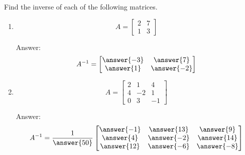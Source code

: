 \documentclass{ximera}
\begin{document}
\begin{problem}

  Find the inverse of each of the following matrices.
  \begin{enumerate}
   \item $$A=\begin{bmatrix}2&7\\1&3\end{bmatrix}$$

    Answer:
    $$A^{-1}=\begin{bmatrix}\answer{-3}&\answer{7}\\\answer{1}&\answer{-2}\end{bmatrix}$$
    
     
    \item $$A=\begin{bmatrix}2&1&4\\4&-2&1\\0&3&-1\end{bmatrix}$$

    Answer:
    $$A^{-1}=\frac{1}{\answer{50}}\begin{bmatrix}\answer{-1}&\answer{13}&\answer{9}\\\answer{4}&\answer{-2}&\answer{14}\\\answer{12}&\answer{-6}&\answer{-8}\end{bmatrix}$$

    \end{enumerate}
\end{problem}
\end{document}
